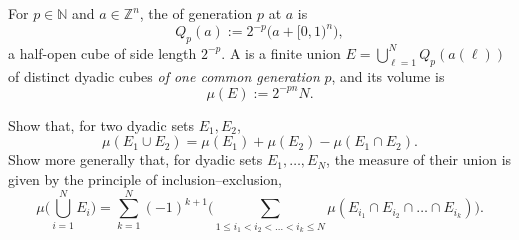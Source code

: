 \begin{definition}
\label{def:dyadic_set}
For $p \in \mathbb{N}$ and $a \in \mathbb{Z}^n$, the 
 of generation $p$ at $a$ is
\[Q_p(a) := 2^{-p}\big(a + [0,1)^n\big),\]
a half-open cube of side length $2^{-p}$. A  
is a finite union $E = \bigcup_{\ell=1}^N Q_p(a(\ell))$ of distinct dyadic cubes \emph{of one
common generation} $p$, and its volume is
\[\mu(E) := 2^{-pn}N.\]
\end{definition}

\begin{exercise}
\label{ex:inclusion_exclusion_dyadic}
Show that, for two dyadic sets $E_1,E_2$,
\[\mu(E_1\cup E_2) = \mu(E_1)+\mu(E_2)-\mu(E_1\cap E_2).\]
Show more generally that, for dyadic sets $E_1,\dots,E_N$, the measure of their union is given
by the principle of inclusion--exclusion,
\[\mu\Big(\bigcup_{i=1}^N E_i\Big)
  = \sum_{k=1}^N(-1)^{k+1}\bigg(\sum_{1\leq i_1<i_2<\dots<i_k\leq N}
    \mu(E_{i_1}\cap E_{i_2}\cap\dots\cap E_{i_k})\bigg).\]
\end{exercise}


